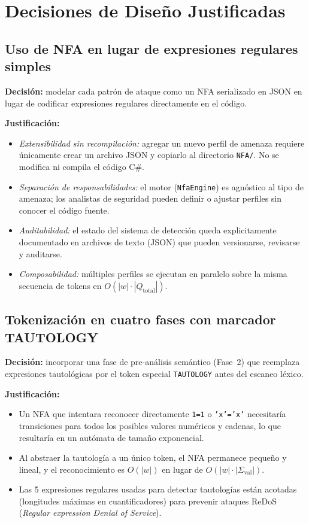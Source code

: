 \documentclass[12pt, a4paper]{report}
\theoremstyle{definition}
\theoremstyle{remark}
\newcommand{\tok}[1]{\texttt{\color{codeblue}#1}}
\begin{document}
\chapter{Decisiones de Diseño Justificadas}

\section{Uso de NFA en lugar de expresiones regulares simples}

\textbf{Decisión:} modelar cada patrón de ataque como un NFA serializado en
JSON en lugar de codificar expresiones regulares directamente en el código.

\textbf{Justificación:}
\begin{itemize}
  \item \emph{Extensibilidad sin recompilación:} agregar un nuevo perfil de
    amenaza requiere únicamente crear un archivo JSON y copiarlo al directorio
    \texttt{NFA/}. No se modifica ni compila el código C\#.
  \item \emph{Separación de responsabilidades:} el motor (\texttt{NfaEngine})
    es agnóstico al tipo de amenaza; los analistas de seguridad pueden definir
    o ajustar perfiles sin conocer el código fuente.
  \item \emph{Auditabilidad:} el estado del sistema de detección queda
    explicitamente documentado en archivos de texto (JSON) que pueden
    versionarse, revisarse y auditarse.
  \item \emph{Composabilidad:} múltiples perfiles se ejecutan en paralelo
    sobre la misma secuencia de tokens en $O(|w| \cdot |Q_{\text{total}}|)$.
\end{itemize}

\section{Tokenización en cuatro fases con marcador TAUTOLOGY}

\textbf{Decisión:} incorporar una fase de pre-análisis semántico (Fase~2) que
reemplaza expresiones tautológicas por el token especial \tok{TAUTOLOGY} antes
del escaneo léxico.

\textbf{Justificación:}
\begin{itemize}
  \item Un NFA que intentara reconocer directamente \texttt{1=1} o \texttt{'x'='x'}
    necesitaría transiciones para todos los posibles valores numéricos y cadenas,
    lo que resultaría en un autómata de tamaño exponencial.
  \item Al abstraer la tautología a un único token, el NFA permanece pequeño
    y lineal, y el reconocimiento es $O(|w|)$ en lugar de $O(|w| \cdot |\Sigma_{\text{val}}|)$.
  \item Las 5 expresiones regulares usadas para detectar tautologías están
    acotadas (longitudes máximas en cuantificadores) para prevenir ataques
    ReDoS (\emph{Regular expression Denial of Service}).
\end{itemize}
\end{document}
